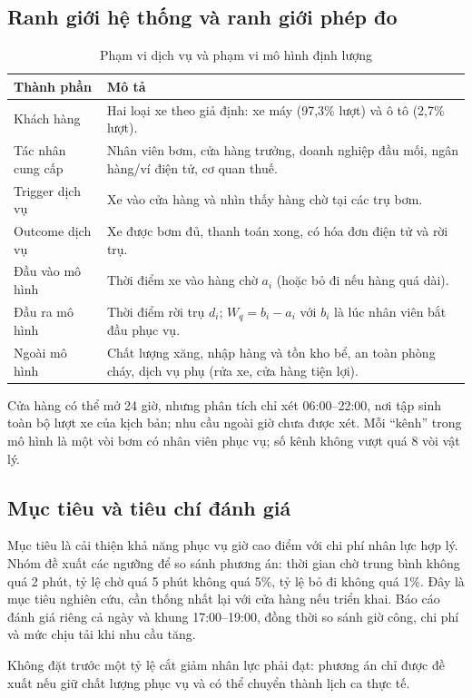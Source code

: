 \subsection{Ranh giới hệ thống và ranh giới phép đo}
\begin{table}[htbp]\centering\small
\caption{Phạm vi dịch vụ và phạm vi mô hình định lượng}\label{r1:boundary}
\begin{tabularx}{\linewidth}{@{}p{32mm}Y@{}}
\toprule
Thành phần & Mô tả \\
\midrule
Khách hàng & Hai loại xe theo giả định: xe máy (97,3\% lượt) và ô tô (2,7\% lượt). \\
Tác nhân cung cấp & Nhân viên bơm, cửa hàng trưởng, doanh nghiệp đầu mối, ngân hàng/ví điện tử, cơ quan thuế. \\
Trigger dịch vụ & Xe vào cửa hàng và nhìn thấy hàng chờ tại các trụ bơm. \\
Outcome dịch vụ & Xe được bơm đủ, thanh toán xong, có hóa đơn điện tử và rời trụ. \\
Đầu vào mô hình & Thời điểm xe vào hàng chờ $a_i$ (hoặc bỏ đi nếu hàng quá dài). \\
Đầu ra mô hình & Thời điểm rời trụ $d_i$; $W_q=b_i-a_i$ với $b_i$ là lúc nhân viên bắt đầu phục vụ. \\
Ngoài mô hình & Chất lượng xăng, nhập hàng và tồn kho bể, an toàn phòng cháy, dịch vụ phụ (rửa xe, cửa hàng tiện lợi). \\
\bottomrule
\end{tabularx}
\end{table}
Cửa hàng có thể mở 24 giờ, nhưng phân tích chỉ xét 06:00--22:00, nơi tập
sinh toàn bộ lượt xe của kịch bản; nhu cầu ngoài giờ chưa được xét. Mỗi ``kênh'' trong mô hình là một vòi bơm có
nhân viên phục vụ; số kênh không vượt quá 8 vòi vật lý.

\subsection{Mục tiêu và tiêu chí đánh giá}
Mục tiêu là cải thiện khả năng phục vụ giờ cao điểm với chi phí nhân lực
hợp lý. Nhóm đề xuất các ngưỡng để so sánh phương án: thời gian chờ trung
bình không quá 2 phút, tỷ lệ chờ quá 5 phút không quá 5\%, tỷ lệ bỏ đi không
quá 1\%. Đây là mục tiêu nghiên cứu, cần thống nhất lại với cửa hàng nếu
triển khai. Báo cáo đánh giá riêng cả ngày và khung 17:00--19:00, đồng thời
so sánh giờ công, chi phí và mức chịu tải khi nhu cầu tăng.

Không đặt trước một tỷ lệ cắt giảm nhân lực phải đạt: phương án chỉ được
đề xuất nếu giữ chất lượng phục vụ và có thể chuyển thành lịch ca thực tế.

